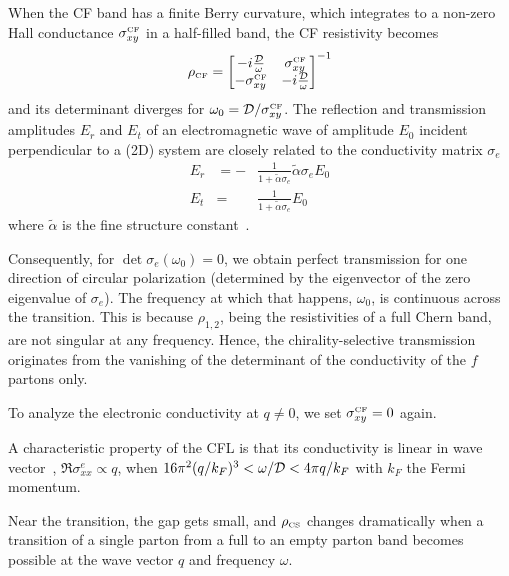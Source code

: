 \documentclass[aps,prl,twocolumn,superscriptaddress,floatfix, 10pt,longbibliography, nofootinbib]{revtex4-2}
\begin{document}
When the CF band has a finite Berry curvature, which integrates to a non-zero Hall conductance $\sigma_{xy}^\text{\tiny CF}$ in a half-filled band, the CF resistivity becomes
\begin{equation}
    \rho_\text{\tiny CF}=\begin{bmatrix}
    -i\frac{ \cal D}{ \omega} & \sigma_{xy}^\text{\tiny CF}\\
    -\sigma_{xy}^\text{\tiny CF} & -i\frac{\cal D}{ \omega}
\end{bmatrix}^{-1}
\end{equation}
 and its determinant diverges for $\omega_0={\cal D}/{\sigma_{xy}^\text{\tiny CF}}$.
The reflection and transmission amplitudes $E_r$ and $E_t$ of an electromagnetic wave of amplitude $E_0$ incident perpendicular to a (2D) system are closely related to the conductivity matrix $\sigma_e$
\begin{eqnarray}
    E_r&=-&\frac{1}{1+{\tilde\alpha\sigma_e}}{\tilde\alpha\sigma_e} E_0 \\
    E_t&=&\frac{1}{1+{\tilde\alpha\sigma_e}}E_0
    \label{reflection}
\end{eqnarray}
where $\tilde\alpha$ is the fine structure constant~\cite{tse_magneto-optical_2011, liu_anomalous_2020, stern_transport_2024}.

Consequently, for $\det \sigma_e(\omega_0)=0$, we obtain perfect transmission for one direction of circular polarization (determined by the eigenvector of the zero eigenvalue of $\sigma_e$).
The frequency at which that happens, $\omega_0$, is continuous across the transition. This is because $\rho_{1,2}$, being the resistivities of a full Chern band,  are not singular at any frequency. Hence, the chirality-selective transmission originates from the vanishing of the determinant of the conductivity of the $f$ partons only.




To analyze the electronic conductivity at $q\ne 0$, we set $\sigma_{xy}^{\text{\tiny CF}}=0$ again.

A characteristic property of the CFL is that its conductivity is linear in wave vector~\cite{halperin_theory_1993,willett_enhanced_1993}, $\Re\sigma^e_{xx}\propto q$, when $16\pi^2 (q/k_F)^3<\omega/{\cal D}< 4\pi q/k_F$ with $k_F$ the Fermi momentum.






Near the transition, the gap gets small, and $\rho_\text{\tiny CS}$ changes dramatically when a transition of a single parton from a  full to an empty parton band becomes possible at the wave vector $q$ and frequency $\omega$.
\end{document}
